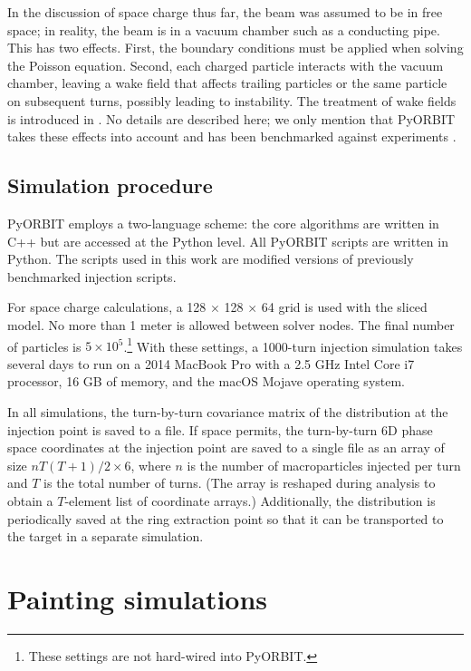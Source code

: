 In the discussion of space charge thus far, the beam was assumed to be in free space; in reality, the beam is in a vacuum chamber such as a conducting pipe. This has two effects. First, the boundary conditions must be applied when solving the Poisson equation. Second, each charged particle interacts with the vacuum chamber, leaving a wake field that affects trailing particles or the same particle on subsequent turns, possibly leading to instability. The treatment of wake fields is introduced in \cite{Chao1993}. No details are described here; we only mention that PyORBIT takes these effects into account and has been benchmarked against experiments \cite{Holmes2011}.






\subsection{Simulation procedure}

PyORBIT employs a two-language scheme: the core algorithms are written in C++ but are accessed at the Python level. All PyORBIT scripts are written in Python. The scripts used in this work are modified versions of previously benchmarked injection scripts.

For space charge calculations, a 128 $\times$ 128 $\times$ 64 grid is used with the sliced model. No more than 1 meter is allowed between solver nodes. The final number of particles is $5 \times 10^{5}$.\footnote{These settings are not hard-wired into PyORBIT.} With these settings, a 1000-turn injection simulation takes several days to run on a 2014 MacBook Pro with a 2.5 GHz Intel Core i7 processor, 16 GB of memory, and the macOS Mojave operating system.

In all simulations, the turn-by-turn covariance matrix of the distribution at the injection point is saved to a file. If space permits, the turn-by-turn 6D phase space coordinates at the injection point are saved to a single file as an array of size $n T (T + 1) / 2 \times 6$, where $n$ is the number of macroparticles injected per turn and $T$ is the total number of turns. (The array is reshaped during analysis to obtain a $T$-element list of coordinate arrays.) Additionally, the distribution is periodically saved at the ring extraction point so that it can be transported to the target in a separate simulation.





\section{Painting simulations}

